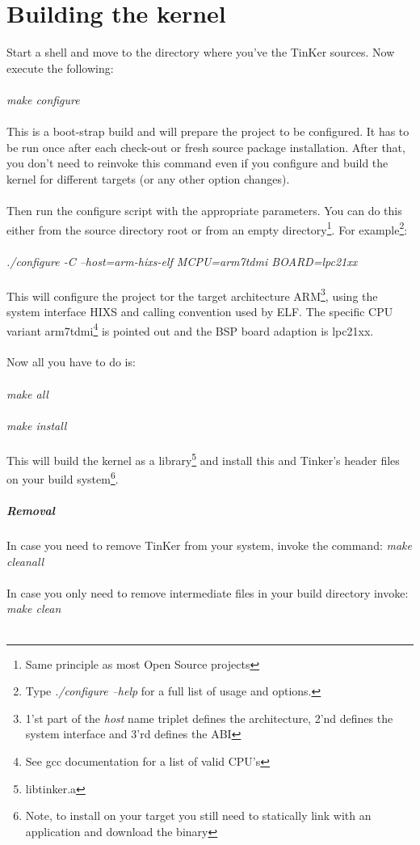 \chapter{Building the kernel}
Start a shell and move to the directory where you've the TinKer sources. Now execute the following:
\\\\
\textit{make configure}
\\\\
This is a boot-strap build and will prepare the project to be configured. It has to be run once after each check-out or fresh source package installation. After that, you don't need to reinvoke this command even if you configure and build the kernel for different targets (or any other option changes).
\\\\
Then run the configure script with the appropriate parameters. You can do this either from the source directory root or from an empty directory\footnote{Same principle as most Open Source projects}. For example\footnote{Type  \textit{./configure --help} for a full list of usage and options.}:
\\\\
\textit{./configure -C --host=arm-hixs-elf MCPU=arm7tdmi BOARD=lpc21xx}
\\\\
This will configure the project tor the target architecture ARM\footnote{1'st part of the \textit{host} name triplet defines the architecture, 2'nd defines the system interface and 3'rd defines the ABI}, using the system interface HIXS and calling convention used by ELF. The specific CPU variant arm7tdmi\footnote{See gcc documentation for a list of valid CPU's} is pointed out and the BSP board adaption is lpc21xx.
\\\\
Now all you have to do is:
\\\\
\textit{make all}
\\\\
\textit{make install}
\\\\
This will build the kernel as a library\footnote{libtinker.a} and install this and Tinker's header files on your build system\footnote{Note, to install on your target you still need to statically link with an application and download the binary}.

\paragraph{Removal}
In case you need to remove TinKer from your system, invoke the command: \textit{make cleanall}\\\\
In case you only need to remove intermediate files in your build directory invoke: \textit{make clean}\\\\

